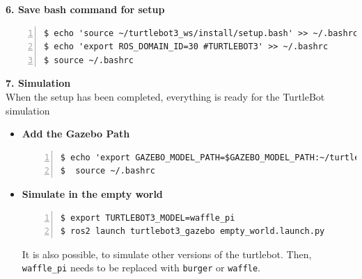 \documentclass[plainarticle,zihtitle,english,final,hyperref,utf8]{zihpub}
\begin{document}
\textbf{6. Save bash command for setup}\\
    \begin{Verbatim}[breaklines=true, breakanywhere=true, baselinestretch=1,fontsize=\scriptsize,numbers=left,frame=single,stepnumber=5,xleftmargin=1cm,xrightmargin=1cm]
$ echo 'source ~/turtlebot3_ws/install/setup.bash' >> ~/.bashrc
$ echo 'export ROS_DOMAIN_ID=30 #TURTLEBOT3' >> ~/.bashrc
$ source ~/.bashrc
    \end{Verbatim}
    
\textbf{7. Simulation}\\
\newline
When the setup has been completed, everything is ready for the TurtleBot simulation
\begin{itemize}
    \item \textbf{Add the Gazebo Path}
    \begin{Verbatim}[breaklines=true, breakanywhere=true, baselinestretch=1,fontsize=\scriptsize,numbers=left,frame=single,stepnumber=5,xleftmargin=1cm,xrightmargin=1cm]
$ echo 'export GAZEBO_MODEL_PATH=$GAZEBO_MODEL_PATH:~/turtlebot3_ws/src/turtlebot3/turtlebot3_simulations/turtlebot3_gazebo/models' >> ~/.bashrc
$  source ~/.bashrc
    \end{Verbatim}
    
    \item \textbf{Simulate in the empty world}
    \begin{Verbatim}[breaklines=true, breakanywhere=true, baselinestretch=1,fontsize=\scriptsize,numbers=left,frame=single,stepnumber=5,xleftmargin=1cm,xrightmargin=1cm]
$ export TURTLEBOT3_MODEL=waffle_pi
$ ros2 launch turtlebot3_gazebo empty_world.launch.py
    \end{Verbatim}
    
    It is also possible, to simulate other versions of the turtlebot. Then, \texttt{waffle\_pi} needs to be replaced with \texttt{burger} or \texttt{waffle}.
\end{itemize}
\end{document}
